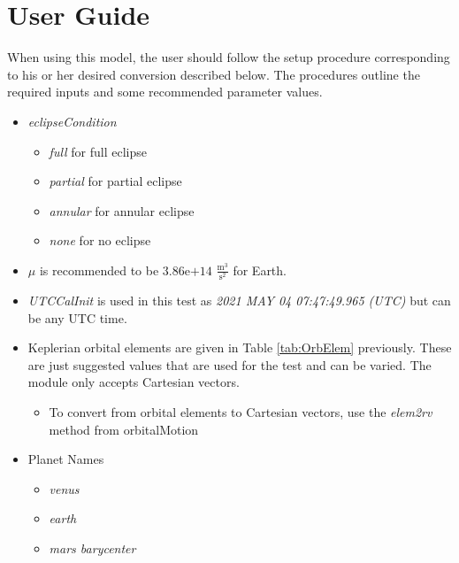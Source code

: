 \section{User Guide}
When using this model, the user should follow the setup procedure corresponding to his or her desired conversion described below. The procedures outline the required inputs and some recommended parameter values.	\begin{itemize}
	\item \textit{eclipseCondition}
	\begin{itemize}
		\item \textit{full} for full eclipse
		\item \textit{partial} for partial eclipse
		\item \textit{annular} for annular eclipse
		\item \textit{none} for no eclipse
	\end{itemize}
	\item $\mu$ is recommended to be $3.86\text{e+}14$ $\frac{\text{m}^3}{\text{s}^2}$ for Earth.
	\item \textit{UTCCalInit} is used in this test as \textit{2021 MAY 04 07:47:49.965 (UTC)} but can be any UTC time.
	\item Keplerian orbital elements are given in Table \ref{tab:OrbElem} previously. These are just suggested values that are used for the test and can be varied. The module only accepts Cartesian vectors.
	\begin{itemize}
		\item To convert from orbital elements to Cartesian vectors, use the \textit{elem2rv} method from orbitalMotion
	\end{itemize}
	\item Planet Names
	\begin{itemize}
		\item \textit{venus}
		\item \textit{earth}
		\item \textit{mars barycenter}
	\end{itemize}
\end{itemize}
